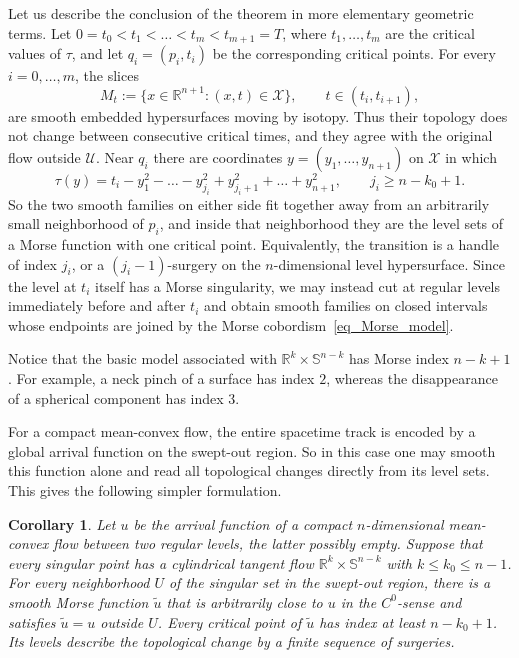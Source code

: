 \documentclass[12pt,twoside,reqno]{amsart}
\newcommand{\IR}{\mathbb{R}}
\newcommand{\IS}{\mathbb{S}}
\newcommand{\UU}{\mathcal{U}}
\newcommand{\XX}{\mathcal{X}}
\newcommand{\td}[1]{\widetilde{#1}}
\newtheorem{Corollary}[equation]{Corollary}
\theoremstyle{definition}
\theoremstyle{remark}
\numberwithin{equation}{section}
\begin{document}
Let us describe the conclusion of the theorem in more elementary geometric terms.
Let $0=t_0<t_1<\ldots<t_m<t_{m+1}=T$, where $t_1,\ldots,t_m$ are the critical values of $\tau$, and let $q_i=(p_i,t_i)$ be the corresponding critical points.
For every $i=0,\ldots,m$, the slices
\[
 M_t:=\{x\in\IR^{n+1}:(x,t)\in\XX\},\qquad t\in(t_i,t_{i+1}),
\]
are smooth embedded hypersurfaces moving by isotopy.
Thus their topology does not change between consecutive critical times, and they agree with the original flow outside $\UU$.
Near $q_i$ there are coordinates $y=(y_1,\ldots,y_{n+1})$ on $\XX$ in which
\[
 \tau(y)=t_i-y_1^2-\ldots-y_{j_i}^2
                 +y_{j_i+1}^2+\ldots+y_{n+1}^2,
 \qquad j_i\geq n-k_0+1.
\tag{2.1}\label{eq_Morse_model}
\]
So the two smooth families on either side fit together away from an arbitrarily small neighborhood of $p_i$, and inside that neighborhood they are the level sets of a Morse function with one critical point.
Equivalently, the transition is a handle of index $j_i$, or a $(j_i-1)$-surgery on the $n$-dimensional level hypersurface.
Since the level at $t_i$ itself has a Morse singularity, we may instead cut at regular levels immediately before and after $t_i$ and obtain smooth families on closed intervals whose endpoints are joined by the Morse cobordism~\eqref{eq_Morse_model}.

Notice that the basic model associated with $\IR^k\times\IS^{n-k}$ has Morse index $n-k+1$.
For example, a neck pinch of a surface has index $2$, whereas the disappearance of a spherical component has index $3$.

\medskip

For a compact mean-convex flow, the entire spacetime track is encoded by a global arrival function on the swept-out region.
So in this case one may smooth this function alone and read all topological changes directly from its level sets.
This gives the following simpler formulation.

\begin{Corollary}\label{Cor_mean_convex}
Let $u$ be the arrival function of a compact $n$-dimensional mean-convex flow between two regular levels, the latter possibly empty.
Suppose that every singular point has a cylindrical tangent flow $\IR^k\times\IS^{n-k}$ with $k\leq k_0\leq n-1$.
For every neighborhood $U$ of the singular set in the swept-out region, there is a smooth Morse function $\td u$ that is arbitrarily close to $u$ in the $C^0$-sense and satisfies $\td u=u$ outside $U$.
Every critical point of $\td u$ has index at least $n-k_0+1$.
Its levels describe the topological change by a finite sequence of surgeries.
\end{Corollary}
\end{document}
